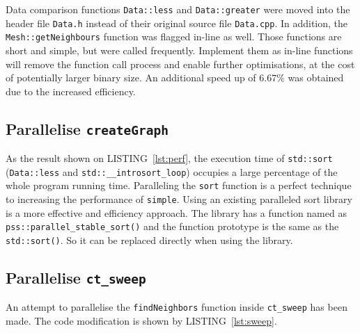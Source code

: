 \documentclass[conference]{IEEEtran}
\newcommand{\lref}[1]{LISTING~\ref{#1}}
\begin{document}
Data comparison functions \texttt{Data::less} and \texttt{Data::greater} were moved into the header file \texttt{Data.h} instead of their original source file \texttt{Data.cpp}. In addition, the \texttt{Mesh::getNeighbours} function was flagged in-line as well. Those functions are short and simple, but were called frequently. Implement them as in-line functions will remove the function call process and enable further optimisations, at the cost of potentially larger binary size. An additional speed up of $6.67 \%$ was obtained due to the increased efficiency. 

\subsection{Parallelise \texttt{createGraph}} \label{sec:graph}

As the result shown on \lref{lst:perf}, the execution time of \texttt{std::sort} (\texttt{Data::less} and \texttt{std::\_\_introsort\_loop}) occupies a large percentage of the whole program running time. Paralleling the \texttt{sort} function is a perfect technique to increasing the performance of \texttt{simple}. Using an existing paralleled sort library \cite{parallelsort} is a more effective and efficiency approach. The library has a function named as \texttt{pss::parallel\_stable\_sort()} and the function prototype is the same as the \texttt{std::sort()}. So it can be replaced directly when using the library.

\subsection{Parallelise \texttt{ct\_sweep}} \label{sec:sweep}

An attempt to parallelise the \texttt{findNeighbors} function inside \texttt{ct\_sweep} has been made. The code modification is shown by \lref{lst:sweep}.
\end{document}
